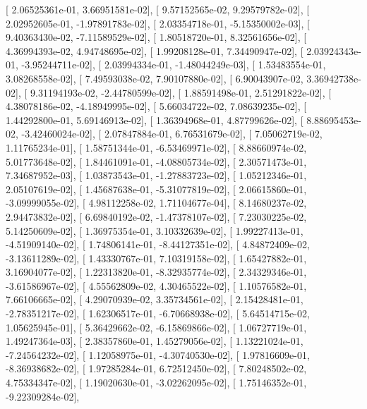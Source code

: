 \documentclass{article}
\begin{document}
       [  2.06525361e-01,   3.66951581e-02],
       [  9.57152565e-02,   9.29579782e-02],
       [  2.02952605e-01,  -1.97891783e-02],
       [  2.03354718e-01,  -5.15350002e-03],
       [  9.40363430e-02,  -7.11589529e-02],
       [  1.80518720e-01,   8.32561656e-02],
       [  4.36994393e-02,   4.94748695e-02],
       [  1.99208128e-01,   7.34490947e-02],
       [  2.03924343e-01,  -3.95244711e-02],
       [  2.03994334e-01,  -1.48044249e-03],
       [  1.53483554e-01,   3.08268558e-02],
       [  7.49593038e-02,   7.90107880e-02],
       [  6.90043907e-02,   3.36942738e-02],
       [  9.31194193e-02,  -2.44780599e-02],
       [  1.88591498e-01,   2.51291822e-02],
       [  4.38078186e-02,  -4.18949995e-02],
       [  5.66034722e-02,   7.08639235e-02],
       [  1.44292800e-01,   5.69146913e-02],
       [  1.36394968e-01,   4.87799626e-02],
       [  8.88695453e-02,  -3.42460024e-02],
       [  2.07847884e-01,   6.76531679e-02],
       [  7.05062719e-02,   1.11765234e-01],
       [  1.58751344e-01,  -6.53469971e-02],
       [  8.88660974e-02,   5.01773648e-02],
       [  1.84461091e-01,  -4.08805734e-02],
       [  2.30571473e-01,   7.34687952e-03],
       [  1.03873543e-01,  -1.27883723e-02],
       [  1.05212346e-01,   2.05107619e-02],
       [  1.45687638e-01,  -5.31077819e-02],
       [  2.06615860e-01,  -3.09999055e-02],
       [  4.98112258e-02,   1.71104677e-04],
       [  8.14680237e-02,   2.94473832e-02],
       [  6.69840192e-02,  -1.47378107e-02],
       [  7.23030225e-02,   5.14250609e-02],
       [  1.36975354e-01,   3.10332639e-02],
       [  1.99227413e-01,  -4.51909140e-02],
       [  1.74806141e-01,  -8.44127351e-02],
       [  4.84872409e-02,  -3.13611289e-02],
       [  1.43330767e-01,   7.10319158e-02],
       [  1.65427882e-01,   3.16904077e-02],
       [  1.22313820e-01,  -8.32935774e-02],
       [  2.34329346e-01,  -3.61586967e-02],
       [  4.55562809e-02,   4.30465522e-02],
       [  1.10576582e-01,   7.66106665e-02],
       [  4.29070939e-02,   3.35734561e-02],
       [  2.15428481e-01,  -2.78351217e-02],
       [  1.62306517e-01,  -6.70668938e-02],
       [  5.64514715e-02,   1.05625945e-01],
       [  5.36429662e-02,  -6.15869866e-02],
       [  1.06727719e-01,   1.49247364e-03],
       [  2.38357860e-01,   1.45279056e-02],
       [  1.13221024e-01,  -7.24564232e-02],
       [  1.12058975e-01,  -4.30740530e-02],
       [  1.97816609e-01,  -8.36938682e-02],
       [  1.97285284e-01,   6.72512450e-02],
       [  7.80248502e-02,   4.75334347e-02],
       [  1.19020630e-01,  -3.02262095e-02],
       [  1.75146352e-01,  -9.22309284e-02],
\end{document}
